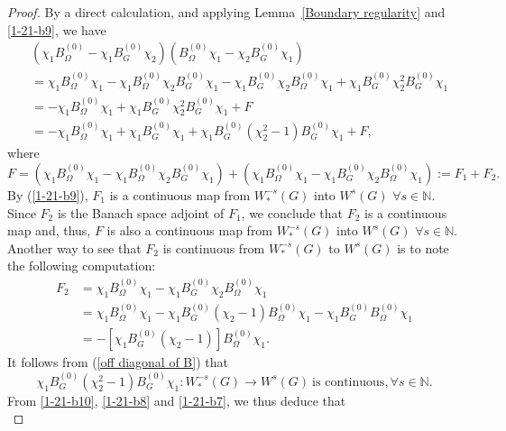 \documentclass[a4paper,centertags,oneside,12pt]{amsart}
\numberwithin{equation}{section}
\begin{document}
\begin{proof}
By a direct calculation, and  applying  Lemma~\ref{Boundary regularity} and \eqref{1-21-b9}, we have 
\begin{equation}\label{1-21-b8}
    \begin{split}
       &(\chi_1 B_\Omega^{(0)}-\chi_1 B_{G}^{(0)}\chi_2)(B_\Omega^{(0)}\chi_1-\chi_2 B_{G}^{(0)}\chi_1)\\
       &=\chi_1 B_\Omega^{(0)}\chi_1-\chi_1 B_\Omega^{(0)}\chi_2 B_G^{(0)}\chi_1-\chi_1 B_G^{(0)}\chi_2 B_\Omega^{(0)}\chi_1+\chi_1 B_G^{(0)}\chi^2_2B_{G}^{(0)}\chi_1\\
       &=-\chi_1 B_\Omega^{(0)}\chi_1+\chi_1 B_G^{(0)}\chi^2_2 B_{G}^{(0)}\chi_1+F\\
       &=-\chi_1 B_\Omega^{(0)}\chi_1+\chi_1B_{G}^{(0)}\chi_1+\chi_1 B_G^{(0)}(\chi^2_2-1)B_{G}^{(0)}\chi_1+F,
 \end{split}
\end{equation}
where $$F=\left(\chi_1 B_\Omega^{(0)}\chi_1-\chi_1 B_\Omega^{(0)}\chi_2 B_G^{(0)}\chi_1\right) + \left(\chi_1 B_\Omega^{(0)}\chi_1-\chi_1 B_G^{(0)}\chi_2 B_\Omega^{(0)}\chi_1\right):=F_1+F_2.$$
By  (\ref{1-21-b9}), $F_1$ is a continuous map from
 $W_\ast^{-s}(G)$ into $ W^s(G)$ $\forall s\in\mathbb N$. Since $F_2$ is the Banach space adjoint of $F_1$, 
 we conclude that $F_2$ is a continuous map and, thus, $F$  is also a continuous map from
 $W_\ast^{-s}(G)$ into $ W^s(G)$ $\forall s\in\mathbb N$. Another way to see that $F_2$ is continuous from $W_{\ast}^{-s}(G)$ to $W^s(G)$ is to note the following computation:
\begin{equation*}
\begin{split}
    F_2&=\chi_1 B_\Omega^{(0)}\chi_1-\chi_1 B_G^{(0)}\chi_2 B_\Omega^{(0)}\chi_1\\
    &=\chi_1 B_\Omega^{(0)}\chi_1-\chi_1 B_G^{(0)}(\chi_2-1)B_\Omega^{(0)}\chi_1-\chi_1 B_G^{(0)}B_\Omega^{(0)}\chi_1\\
    &=-[\chi_1 B_G^{(0)}(\chi_2-1)]B_\Omega^{(0)}\chi_1.
    \end{split}
\end{equation*}
It follows from (\ref{off diagonal of B}) that 
\begin{equation}\label{1-21-b7}
    \chi_1 B_G^{(0)}(\chi_2^2-1)B_G^{(0)}\chi_1: W_\ast^{-s}(G)\rightarrow W^s(G)~\text{is continuous}, \forall s\in\mathbb N.
\end{equation}
From \eqref{1-21-b10}, \eqref{1-21-b8} and \eqref{1-21-b7}, we thus  deduce that  
\begin{equation*}

\end{equation*}
\end{proof}
\end{document}
